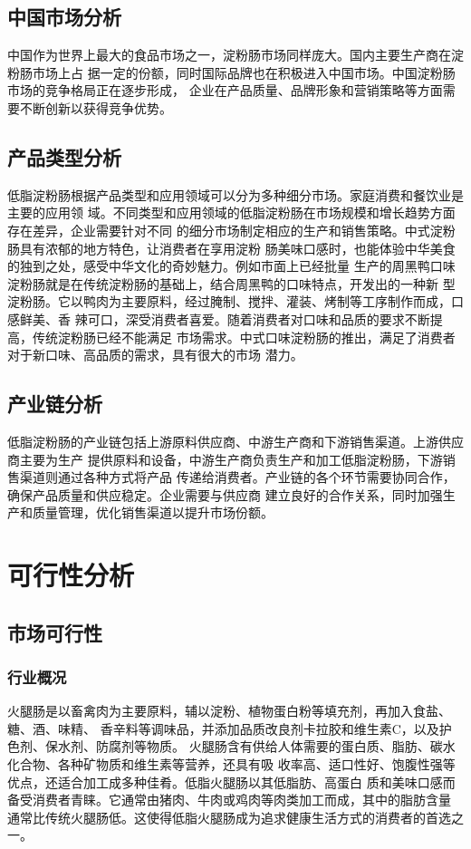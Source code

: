 \documentclass[UTF8]{ctexart}
\begin{document}
	\subsection{中国市场分析}
	中国作为世界上最大的食品市场之一，淀粉肠市场同样庞大。国内主要生产商在淀粉肠市场上占
	据一定的份额，同时国际品牌也在积极进入中国市场。中国淀粉肠市场的竞争格局正在逐步形成，
	企业在产品质量、品牌形象和营销策略等方面需要不断创新以获得竞争优势。
	
	\subsection{产品类型分析}
	低脂淀粉肠根据产品类型和应用领域可以分为多种细分市场。家庭消费和餐饮业是主要的应用领
	域。不同类型和应用领域的低脂淀粉肠在市场规模和增长趋势方面存在差异，企业需要针对不同
	的细分市场制定相应的生产和销售策略。中式淀粉肠具有浓郁的地方特色，让消费者在享用淀粉
	肠美味口感时，也能体验中华美食的独到之处，感受中华文化的奇妙魅力。例如市面上已经批量
	生产的周黑鸭口味淀粉肠就是在传统淀粉肠的基础上，结合周黑鸭的口味特点，开发出的一种新
	型淀粉肠。它以鸭肉为主要原料，经过腌制、搅拌、灌装、烤制等工序制作而成，口感鲜美、香
	辣可口，深受消费者喜爱。随着消费者对口味和品质的要求不断提高，传统淀粉肠已经不能满足
	市场需求。中式口味淀粉肠的推出，满足了消费者对于新口味、高品质的需求，具有很大的市场
	潜力。

	\subsection{产业链分析}
	低脂淀粉肠的产业链包括上游原料供应商、中游生产商和下游销售渠道。上游供应商主要为生产
	提供原料和设备，中游生产商负责生产和加工低脂淀粉肠，下游销售渠道则通过各种方式将产品
	传递给消费者。产业链的各个环节需要协同合作，确保产品质量和供应稳定。企业需要与供应商
	建立良好的合作关系，同时加强生产和质量管理，优化销售渠道以提升市场份额。

	\section{可行性分析}
	\subsection{市场可行性}
	\subsubsection{行业概况}
	火腿肠是以畜禽肉为主要原料，辅以淀粉、植物蛋白粉等填充剂，再加入食盐、糖、酒、味精、
	香辛料等调味品，并添加品质改良剂卡拉胶和维生素C，以及护色剂、保水剂、防腐剂等物质。
	火腿肠含有供给人体需要的蛋白质、脂肪、碳水化合物、各种矿物质和维生素等营养，还具有吸
	收率高、适口性好、饱腹性强等优点，还适合加工成多种佳肴。低脂火腿肠以其低脂肪、高蛋白
	质和美味口感而备受消费者青睐。它通常由猪肉、牛肉或鸡肉等肉类加工而成，其中的脂肪含量
	通常比传统火腿肠低。这使得低脂火腿肠成为追求健康生活方式的消费者的首选之一。
\end{document}
